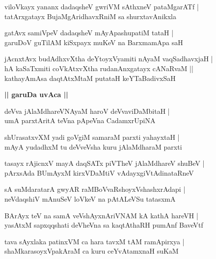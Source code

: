 \documentclass[twoside,12pt,openright]{book}
\newcounter{shloka}[chapter]
\def\uvaca#1{\centerline{{\large\textbf{#1}}}}
\begin{document}
\begin{shloka}%
viloVkayx yananx dadaqsheV gwriVM sAthxneV pataMgarATf |\\
tatArxgatayx BujaMgAridhavxRniM sa shurxtavAnikxla 
\end{shloka}

\begin{shloka}%
gatAvx samiVpeV dadaqsheV mAyApashupatiM tataH |\\
garuDoV guTilAM kiSxpayx muKeV na BarxmamApa saH 
\end{shloka}

\begin{shloka}%
jAcnxtAvx budAdhxvXtha deYtoyxVyamiti nAyaM vaqSadhavxjaH |\\
hA kaSaTxmiti coVkAtxvXtha rudanAnxgatayx cANaRvaM ||\\
kathayAmAsa daqtAtxMtaM putataH keYTaBadivxSaH 
\end{shloka}

\uvaca{|| garuDa uvAca ||}

\begin{shloka}%
deVva jAlaMdhareVNAyaM haroV deVvaviDaMbitaH |\\
umA parxtAritA teVna pApeVna CadamxrUpiNA
\end{shloka}

\begin{shloka}%
shUrasatxvXM yadi goVgiM samaraM parxti yahayxtaH |\\
mAyA yudadhxM tu deVveVsha kuru jAlaMdharaM parxti 
\end{shloka}

\begin{shloka}%
tasayx rAjicnxV mayA daqSATx piVTheV jAlaMdhareV shuBeV |\\
pArxsAda BUmAyxM kirxVDaMtiV vAdayxgiVtAdinataRneV 
\end{shloka}

\begin{shloka}%
sA suMdaratarA gwyAR raMBoVvaRshoyxVshashxrAdapi |\\
neVdaqshiV mAnuSeV loVkeV na pAtALeVSu tatasxmA 
\end{shloka}

\begin{shloka}%
BArAyx teV na samA veVshAyxnAriVNAM kA kathA hareVH |\\
yasAtxM sapxqqshati deVheVna sa kaqtAthaRH pumAnf BaveVtf 
\end{shloka}

\begin{shloka}%
tava sAyxlaka patinxVM ca hara tavxM tAM ramApirxya |\\
shaMkarasoyxVpakAraM ca kuru ceYvAtamxnaH suKaM 
\end{shloka}
\end{document}
